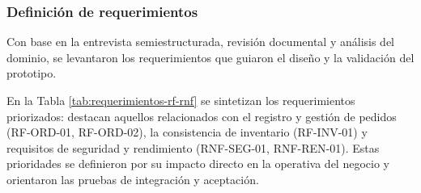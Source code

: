   \subsubsection{Definición de requerimientos}

  Con base en la entrevista semiestructurada, revisión documental y análisis del dominio, se levantaron los requerimientos que guiaron el diseño y la validación del prototipo.

  En la Tabla \ref{tab:requerimientos-rf-rnf} se sintetizan los requerimientos priorizados: destacan aquellos relacionados con el registro y gestión de pedidos (RF-ORD-01, RF-ORD-02), la consistencia de inventario (RF-INV-01) y requisitos de seguridad y rendimiento (RNF-SEG-01, RNF-REN-01). Estas prioridades se definieron por su impacto directo en la operativa del negocio y orientaron las pruebas de integración y aceptación.

